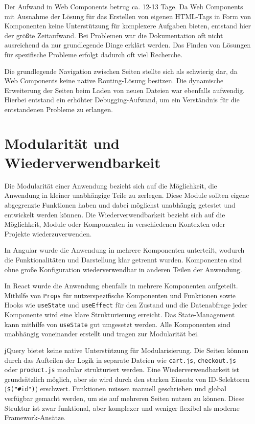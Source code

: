 \documentclass[oneside]{ausarbeitung}
\begin{document}
Der Aufwand in Web Components betrug ca. 12-13 Tage. Da Web Components mit Ausnahme der Lösung für das Erstellen von eigenen HTML-Tags in Form von Komponenten keine Unterstützung für komplexere Aufgaben bieten, entstand hier der größte Zeitaufwand. Bei Problemen war die Dokumentation oft nicht ausreichend da nur grundlegende Dinge erklärt werden. Das Finden von Lösungen für spezifische Probleme erfolgt dadurch oft viel Recherche.

Die grundlegende Navigation zwischen Seiten stellte sich als schwierig dar, da Web Components keine native Routing-Lösung besitzen. Die dynamische Erweiterung der Seiten beim Laden von neuen Dateien war ebenfalls aufwendig. Hierbei entstand ein erhöhter Debugging-Aufwand, um ein Verständnis für die entstandenen Probleme zu erlangen.

\section{Modularität und Wiederverwendbarkeit}

Die Modularität einer Anwendung bezieht sich auf die Möglichkeit, die Anwendung in kleiner unabhängige Teile zu zerlegen. Diese Module sollten eigene abgegrenzte Funktionen haben und dabei möglichst unabhängig getestet und entwickelt werden können. 
Die Wiederverwendbarkeit bezieht sich auf die Möglichkeit, Module oder Komponenten in verschiedenen Kontexten oder Projekte wiederzuverwenden. 

In Angular wurde die Anwendung in mehrere Komponenten unterteilt, wodurch die Funktionalitäten und Darstellung klar getrennt wurden. Komponenten sind ohne große Konfiguration wiederverwendbar in anderen Teilen der Anwendung.  

In React wurde die Anwendung ebenfalls in mehrere Komponenten aufgeteilt. Mithilfe von \texttt{Props} für nutzerspezifische Komponenten und Funktionen sowie Hooks wie \texttt{useState} und \texttt{useEffect} für den Zustand und die Datenabfrage jeder Komponente wird eine klare Strukturierung erreicht. Das State-Management kann mithilfe von \texttt{useState} gut umgesetzt werden. Alle Komponenten sind unabhängig voneinander erstellt und tragen zur Modularität bei.  

jQuery bietet keine native Unterstützung für Modularisierung. Die Seiten können durch das Aufteilen der Logik in separate Dateien wie \texttt{cart.js}, \texttt{checkout.js} oder \texttt{product.js} modular strukturiert werden. Eine Wiederverwendbarkeit ist grundsätzlich möglich, aber sie wird durch den starken Einsatz von ID-Selektoren (\texttt{\$("\#id")}) erschwert. Funktionen müssen manuell geschrieben und global verfügbar gemacht werden, um sie auf mehreren Seiten nutzen zu können. Diese Struktur ist zwar funktional, aber komplexer und weniger flexibel als moderne Framework-Ansätze.
\end{document}
